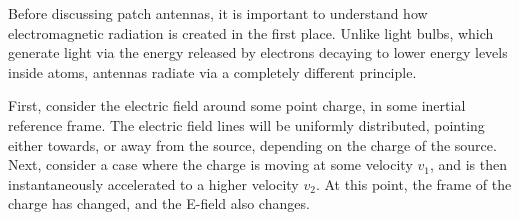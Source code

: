 \documentclass[12pt]{article}
\begin{document}
Before discussing patch antennas, it is important to understand how electromagnetic radiation is created in the first place. Unlike light bulbs, which generate light via the energy released by electrons decaying to lower energy levels inside atoms, antennas radiate via a completely different principle.

First, consider the electric field around some point charge, in some inertial reference frame. The electric field lines will be uniformly distributed, pointing either towards, or away from the source, depending on the charge of the source\cite{schroeder}. Next, consider a case where the charge is moving at some velocity $v_1$, and is then instantaneously accelerated to a higher velocity $v_2$. At this point, the frame of the charge has changed, and the E-field also changes.   
\end{document}
